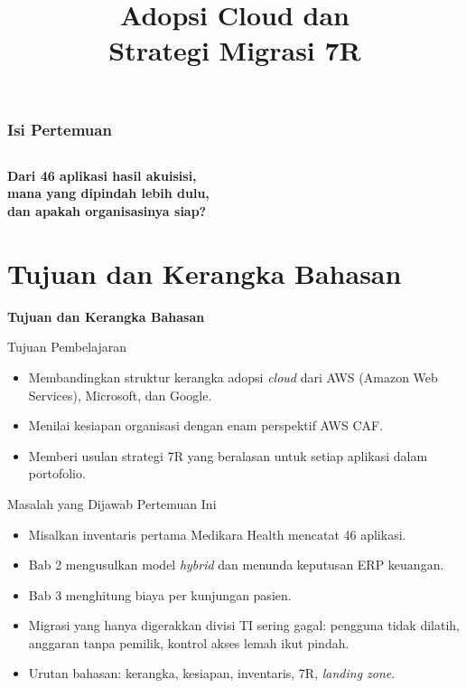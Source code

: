 \documentclass[aspectratio=169, table, 12pt]{beamer}
\title{\Huge Adopsi Cloud dan\\ \vspace{10pt} Strategi Migrasi 7R}
\begin{document}
\frame{\titlepage}

\begin{frame}
  \frametitle{Isi Pertemuan}
  \vspace{10pt}
  \begin{columns}[t]
    {\small\tableofcontents[sections={1-4}]}

    {\small\tableofcontents[sections={5-8}]}
  \end{columns}
\end{frame}

\begin{frame}{\hfill}
  \centering
  \LARGE{\textbf{Dari 46 aplikasi hasil akuisisi,\\mana yang dipindah lebih dulu,\\dan
  apakah organisasinya siap?}}
\end{frame}

\section{Tujuan dan Kerangka Bahasan}

\begin{frame}{\hfill}
  \centering
  \Huge{\textbf{Tujuan dan Kerangka Bahasan}}
\end{frame}

\begin{frame}{Tujuan Pembelajaran}
  \vspace{6pt}
  \begin{itemize}
    \item Membandingkan struktur kerangka adopsi \textit{cloud} dari AWS (Amazon Web
          Services), Microsoft, dan Google.
    \item Menilai kesiapan organisasi dengan enam perspektif AWS CAF.
    \item Memberi usulan strategi 7R yang beralasan untuk setiap aplikasi dalam
          portofolio.
  \end{itemize}
\end{frame}

\begin{frame}{Masalah yang Dijawab Pertemuan Ini}
  \begin{itemize}
    \item Misalkan inventaris pertama Medikara Health mencatat 46 aplikasi.
    \item Bab 2 mengusulkan model \textit{hybrid} dan menunda keputusan ERP keuangan.
    \item Bab 3 menghitung biaya per kunjungan pasien.
    \item Migrasi yang hanya digerakkan divisi TI sering gagal: pengguna tidak dilatih,
          anggaran tanpa pemilik, kontrol akses lemah ikut pindah.
    \item Urutan bahasan: kerangka, kesiapan, inventaris, 7R, \textit{landing zone}.
  \end{itemize}
\end{frame}
\end{document}
